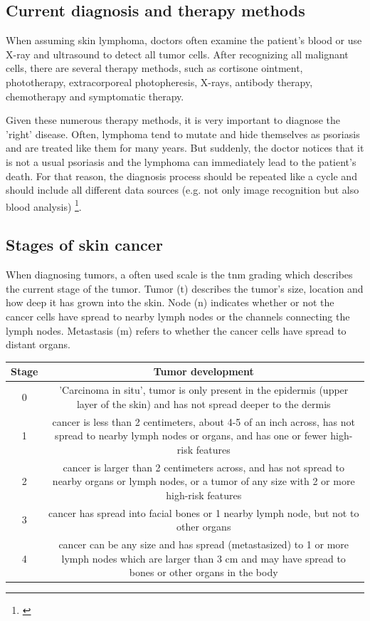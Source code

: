 \subsection{Current diagnosis and therapy methods}

When assuming skin lymphoma, doctors often examine the patient's blood or use X-ray and ultrasound to detect all tumor cells. 
After recognizing all malignant cells, there are several therapy methods, such as cortisone ointment, phototherapy, extracorporeal photopheresis, X-rays, antibody therapy, chemotherapy and symptomatic therapy.

Given these numerous therapy methods, it is very important to diagnose the 'right' disease. Often, lymphoma tend to mutate and hide themselves as psoriasis and are treated like them for many years. But suddenly, the doctor notices that it is not a usual psoriasis and the lymphoma can immediately lead to the patient's death. For that reason, the diagnosis process should be repeated like a cycle and should include all different data sources (e.g. not only image recognition but also blood analysis) \footnote{\cite{ndr_lymphom}}. 

\subsection{Stages of skin cancer}

When diagnosing tumors, a often used scale is the \ac{tnm} grading which describes the current stage of the tumor. 
Tumor (t) describes the tumor's size, location and how deep it has grown into the skin. Node (n) indicates whether or not the cancer cells have spread to nearby lymph nodes or the channels connecting the lymph nodes. Metastasis (m) refers to whether the cancer cells have spread to distant organs.

\begin{center}
 \begin{tabular}{|| c | c ||} 
 \hline
Stage & Tumor development \\ [0.5ex] 
\hline\hline
0 & 'Carcinoma in situ', tumor is only present in the epidermis (upper layer of the skin) and has not spread deeper to the dermis \\
\hline
1 & cancer is less than 2 centimeters, about 4-5 of an inch across, has not spread to nearby lymph nodes or organs, and has one or fewer high-risk features  \\
\hline
2 & cancer is larger than 2 centimeters across, and has not spread to nearby organs or lymph nodes, or a tumor of any size with 2 or more high-risk features \\
\hline
3 & cancer has spread into facial bones or 1 nearby lymph node, but not to other organs  \\
\hline
4 & cancer can be any size and has spread (metastasized) to 1 or more lymph nodes which are larger than 3 cm and may have spread to bones or other organs in the body \\
 \hline
\end{tabular}
\end{center}

